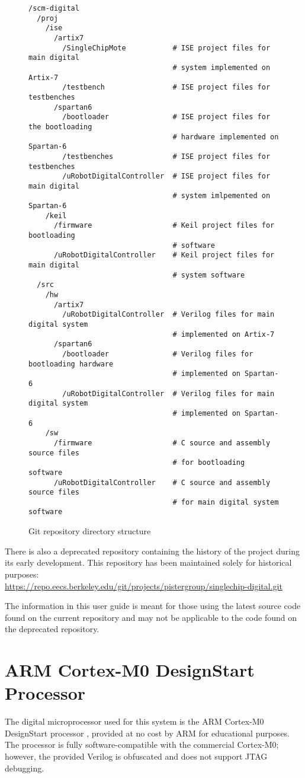 \begin{figure}
\begin{verbatim}
/scm-digital
  /proj
    /ise
      /artix7
        /SingleChipMote           # ISE project files for main digital
                                  # system implemented on Artix-7
        /testbench                # ISE project files for testbenches
      /spartan6
        /bootloader               # ISE project files for the bootloading
                                  # hardware implemented on Spartan-6
        /testbenches              # ISE project files for testbenches
        /uRobotDigitalController  # ISE project files for main digital
                                  # system imlpemented on Spartan-6
    /keil
      /firmware                   # Keil project files for bootloading
                                  # software
      /uRobotDigitalController    # Keil project files for main digital
                                  # system software
  /src
    /hw
      /artix7
        /uRobotDigitalController  # Verilog files for main digital system
                                  # implemented on Artix-7
      /spartan6
        /bootloader               # Verilog files for bootloading hardware
                                  # implemented on Spartan-6
        /uRobotDigitalController  # Verilog files for main digital system
                                  # implemented on Spartan-6
    /sw
      /firmware                   # C source and assembly source files
                                  # for bootloading software
      /uRobotDigitalController    # C source and assembly source files
                                  # for main digital system software
\end{verbatim}
\caption{Git repository directory structure}
\label{verb:repo-structure}
\end{figure}


There is also a deprecated repository containing the history of the project during its early development. This repository has been maintained solely for historical purposes:
\\
\url{https://repo.eecs.berkeley.edu/git/projects/pistergroup/singlechip-digital.git}

The information in this user guide is meant for those using the latest source code found on the current repository and may not be applicable to the code found on the deprecated repository.

\section{ARM Cortex-M0 DesignStart Processor} \label{arm-ds}
The digital microprocessor used for this system is the ARM Cortex-M0 DesignStart processor \cite{arm-cm0ds} \cite{cm0ds-architecture}, provided at no cost by ARM for educational purposes. The processor is fully software-compatible with the commercial Cortex-M0; however, the provided Verilog is obfuscated and does not support JTAG debugging.

